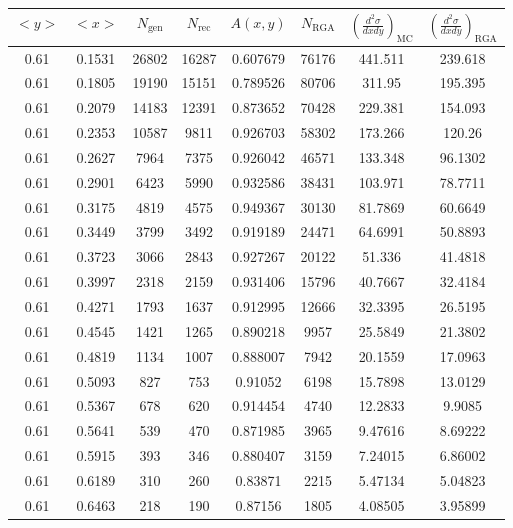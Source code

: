 \begin{table}[h!]
	\centering
	\begin{tabular}{ |c|c|c|c|c|c|c|c| } 
		\hline
		$<y>$ & $<x>$ & $N_{\mathrm{gen}}$ & $N_{\mathrm{rec}}$ & $A(x,y)$ & $N_{\mathrm{RGA}}$ & $\left( \frac{d^2\sigma}{dxdy} \right)_{\mathrm{MC}}$ & $\left( \frac{d^2\sigma}{dxdy} \right)_{\mathrm{RGA}}$ \\
		\hline
		0.61 & 0.1531 & 26802 & 16287 & 0.607679 & 76176 & 441.511 & 239.618 \\ 
		0.61 & 0.1805 & 19190 & 15151 & 0.789526 & 80706 & 311.95 & 195.395 \\
		0.61 & 0.2079 & 14183 & 12391 & 0.873652 & 70428 & 229.381 & 154.093 \\ 
		0.61 & 0.2353 & 10587 & 9811 & 0.926703 & 58302 & 173.266 & 120.26 \\ 
		0.61 & 0.2627 & 7964 & 7375 & 0.926042 & 46571 & 133.348 & 96.1302 \\ 
		0.61 & 0.2901 & 6423 & 5990 & 0.932586 & 38431 & 103.971 & 78.7711 \\ 
		0.61 & 0.3175 & 4819 & 4575 & 0.949367 & 30130 & 81.7869 & 60.6649 \\ 
		0.61 & 0.3449 & 3799 & 3492 & 0.919189 & 24471 & 64.6991 & 50.8893 \\ 
		0.61 & 0.3723 & 3066 & 2843 & 0.927267 & 20122 & 51.336 & 41.4818 \\ 
		0.61 & 0.3997 & 2318 & 2159 & 0.931406 & 15796 & 40.7667 & 32.4184 \\ 
		0.61 & 0.4271 & 1793 & 1637 & 0.912995 & 12666 & 32.3395 & 26.5195 \\ 
		0.61 & 0.4545 & 1421 & 1265 & 0.890218 & 9957 & 25.5849 & 21.3802 \\ 
		0.61 & 0.4819 & 1134 & 1007 & 0.888007 & 7942 & 20.1559 & 17.0963 \\ 
		0.61 & 0.5093 & 827 & 753 & 0.91052 & 6198 & 15.7898 & 13.0129 \\ 
		0.61 & 0.5367 & 678 & 620 & 0.914454 & 4740 & 12.2833 & 9.9085 \\ 
		0.61 & 0.5641 & 539 & 470 & 0.871985 & 3965 & 9.47616 & 8.69222 \\ 
		0.61 & 0.5915 & 393 & 346 & 0.880407 & 3159 & 7.24015 & 6.86002 \\ 
		0.61 & 0.6189 & 310 & 260 & 0.83871 & 2215 & 5.47134 & 5.04823 \\ 
		0.61 & 0.6463 & 218 & 190 & 0.87156 & 1805 & 4.08505 & 3.95899 \\ 
		\hline
	\end{tabular}
\end{table}

